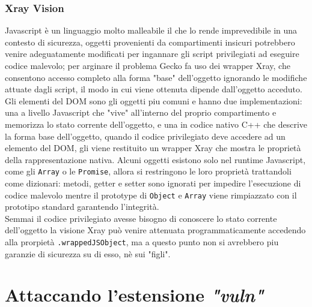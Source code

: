 \documentclass[]{./sapthesis/sapthesis}
\newcommand{\code}[1]{\texttt{#1}}
\newcommand{\vuln}{\textit{"vuln"}}
\begin{document}
        \subsection{Xray Vision}
            Javascript è un linguaggio molto malleabile il che lo rende imprevedibile in una contesto di
            sicurezza, oggetti provenienti da compartimenti insicuri potrebbero venire adeguatamente
            modificati per ingannare gli script privilegiati ad eseguire codice malevolo; per arginare
            il problema Gecko fa uso dei wrapper Xray, che consentono accesso completo alla forma "base"
            dell'oggetto ignorando le modifiche attuate dagli script, il modo in cui viene ottenuta
            dipende dall'oggetto acceduto.\\
            Gli elementi del DOM sono gli oggetti piu comuni e hanno due implementazioni: 
            una a livello Javascript che "vive" all'interno del proprio compartimento e memorizza lo
            stato corrente dell'oggetto, e una in codice nativo C++ che descrive la forma base
            dell'oggetto, quando il codice privilegiato deve accedere ad un elemento del DOM, gli viene
            restituito un wrapper Xray che mostra le proprietà della rappresentazione nativa. 
            Alcuni oggetti esistono solo nel runtime Javascript, come gli \code{Array} o le \code{Promise},
            allora si restringono le loro proprietà trattandoli come dizionari: metodi, getter e setter 
            sono ignorati per impedire l'esecuzione di codice malevolo mentre il prototype di \code{Object}
            e \code{Array} viene rimpiazzato con il prototipo standard garantendo l'integrità.\\
            Semmai il codice privilegiato avesse bisogno di conoscere lo stato corrente dell'oggetto la
            visione Xray può venire attenuata programmaticamente accedendo alla prorpietà \code{.wrappedJSObject},
            ma a questo punto non si avrebbero piu garanzie di sicurezza su di esso, nè sui "figli".


\chapter{Attaccando l'estensione \vuln}
\end{document}
